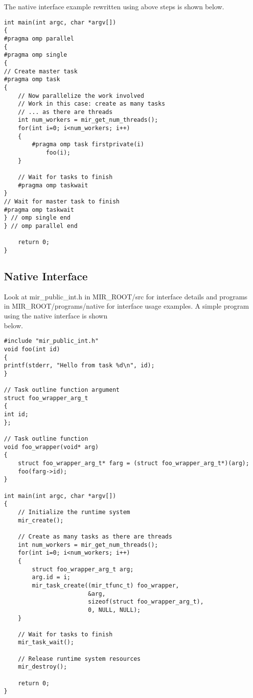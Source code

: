 \documentclass[11pt,a4paper]{article}
\begin{document}
The native interface example rewritten using above steps is shown below.

\begin{lstlisting}[style=MyCStyle]
int main(int argc, char *argv[])
{
#pragma omp parallel
{
#pragma omp single
{
// Create master task
#pragma omp task
{
    // Now parallelize the work involved
    // Work in this case: create as many tasks
    // ... as there are threads
    int num_workers = mir_get_num_threads();
    for(int i=0; i<num_workers; i++)
    {
        #pragma omp task firstprivate(i)
            foo(i);
    }

    // Wait for tasks to finish
    #pragma omp taskwait
}
// Wait for master task to finish
#pragma omp taskwait
} // omp single end
} // omp parallel end

    return 0;
}
\end{lstlisting}

\subsection{Native Interface}\label{native-interface}

Look at mir\_public\_int.h in MIR\_ROOT/src for interface details and programs in MIR\_ROOT/programs/native for interface usage examples. A simple program using the native interface is shown\\below.

\begin{lstlisting}[style=MyCStyle]
#include "mir_public_int.h"
void foo(int id)
{
printf(stderr, "Hello from task %d\n", id);
}

// Task outline function argument
struct foo_wrapper_arg_t
{
int id;
};

// Task outline function
void foo_wrapper(void* arg)
{
    struct foo_wrapper_arg_t* farg = (struct foo_wrapper_arg_t*)(arg);
    foo(farg->id);
}

int main(int argc, char *argv[])
{
    // Initialize the runtime system
    mir_create();

    // Create as many tasks as there are threads
    int num_workers = mir_get_num_threads();
    for(int i=0; i<num_workers; i++)
    {
        struct foo_wrapper_arg_t arg;
        arg.id = i;
        mir_task_create((mir_tfunc_t) foo_wrapper,
                        &arg,
                        sizeof(struct foo_wrapper_arg_t),
                        0, NULL, NULL);
    }

    // Wait for tasks to finish
    mir_task_wait();

    // Release runtime system resources
    mir_destroy();

    return 0;
}
\end{lstlisting}
\end{document}
